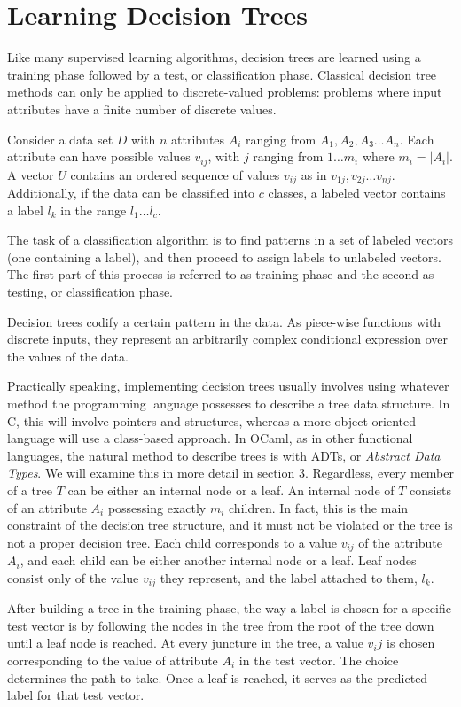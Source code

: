 \documentclass[12pt, letterpaper]{article}
\begin{document}
\section{Learning Decision Trees}
Like many supervised learning algorithms, decision trees are learned using a training phase followed by a test, or classification phase. Classical decision tree methods can only be applied to discrete-valued problems: problems where input attributes have a finite number of discrete values. 

Consider a data set $D$ with $n$ attributes $A_i$ ranging from $A_1, A_2, A_3 \dots A_n$. Each attribute can have possible values $v_{ij}$, with $j$ ranging from $1\dots m_i$ where $m_i = |A_i|$. A vector $U$ contains an ordered sequence of values $v_{ij}$ as in $v_{1j}, v_{2j}\dots v_{nj}$. Additionally, if the data can be classified into $c$ classes, a labeled vector contains a label $l_k$ in the range $l_1\dots l_c$. 

The task of a classification algorithm is to find patterns in a set of labeled vectors (one containing a label), and then proceed to assign labels to unlabeled vectors. The first part of this process is referred to as training phase and the second as testing, or classification phase.

Decision trees codify a certain pattern in the data. As piece-wise functions with discrete inputs, they represent an arbitrarily complex conditional expression over the values of the data. 

Practically speaking, implementing decision trees usually involves using whatever method the programming language possesses to describe a tree data structure. In C, this will involve pointers and structures, whereas a more object-oriented language will use a class-based approach. In OCaml, as in other functional languages, the natural method to describe trees is with ADTs, or \emph{Abstract Data Types}. We will examine this in more detail in section 3. Regardless, every member of a tree $T$ can be either an internal node or a leaf. An internal node of $T$ consists of an attribute $A_i$ possessing exactly $m_i$ children. In fact, this is the main constraint of the decision tree structure, and it must not be violated or the tree is not a proper decision tree. Each child corresponds to a value $v_{ij}$ of the attribute $A_i$, and each child can be either another internal node or a leaf. Leaf nodes consist only of the value $v_{ij}$ they represent, and the label attached to them, $l_k$.

After building a tree in the training phase, the way a label is chosen for a specific test vector is by following the nodes in the tree from the root of the tree down until a leaf node is reached. At every juncture in the tree, a value $v_ij$ is chosen corresponding to the value of attribute $A_i$ in the test vector. The choice determines the path to take. Once a leaf is reached, it serves as the predicted label for that test vector.
\end{document}

